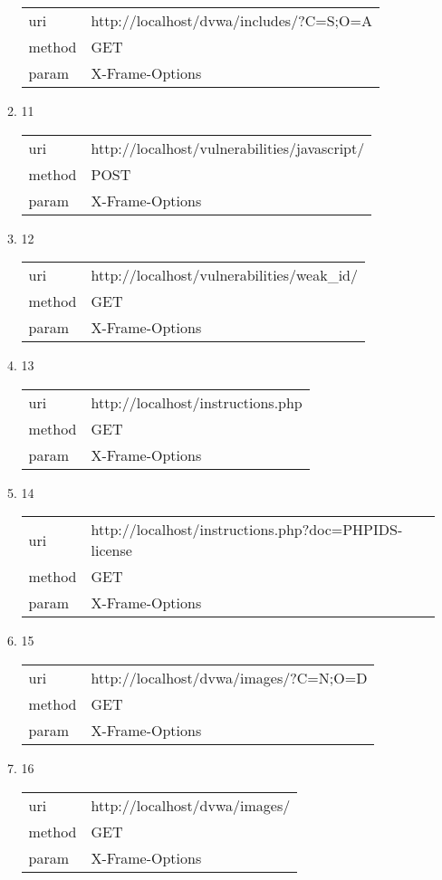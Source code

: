 \documentclass[10pt]{article}
\begin{document}
\begin{itemize}
\begin{enumerate}
\begin{tabular}{| l | p{14cm}}
uri & http://localhost/dvwa/includes/?C=S;O=A \\
method & GET \\
param & X-Frame-Options \\
\end{tabular}
\item[] 11
\begin{tabular}{| l | p{14cm}}
uri & http://localhost/vulnerabilities/javascript/ \\
method & POST \\
param & X-Frame-Options \\
\end{tabular}
\item[] 12
\begin{tabular}{| l | p{14cm}}
uri & http://localhost/vulnerabilities/weak{\_}id/ \\
method & GET \\
param & X-Frame-Options \\
\end{tabular}
\item[] 13
\begin{tabular}{| l | p{14cm}}
uri & http://localhost/instructions.php \\
method & GET \\
param & X-Frame-Options \\
\end{tabular}
\item[] 14
\begin{tabular}{| l | p{14cm}}
uri & http://localhost/instructions.php?doc=PHPIDS-license \\
method & GET \\
param & X-Frame-Options \\
\end{tabular}
\item[] 15
\begin{tabular}{| l | p{14cm}}
uri & http://localhost/dvwa/images/?C=N;O=D \\
method & GET \\
param & X-Frame-Options \\
\end{tabular}
\item[] 16
\begin{tabular}{| l | p{14cm}}
uri & http://localhost/dvwa/images/ \\
method & GET \\
param & X-Frame-Options \\
\end{tabular}

\end{enumerate}
\end{itemize}
\end{document}
